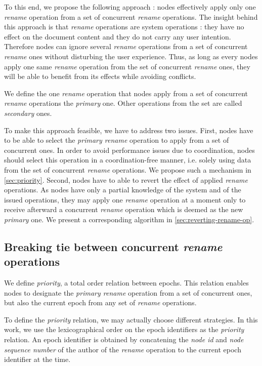 \documentclass[10pt,journal,compsoc]{IEEEtran}
\newcommand{\ie}{i.e. }
\begin{document}
To this end, we propose the following approach : nodes effectively apply only one \emph{rename} operation from a set of concurrent \emph{rename} operations.
The insight behind this approach is that \emph{rename} operations are system operations : they have no effect on the document content and they do not carry any user intention.
Therefore nodes can ignore several \emph{rename} operations from a set of concurrent \emph{rename} ones without disturbing the user experience.
Thus, as long as every nodes apply one same \emph{rename} operation from the set of concurrent \emph{rename} ones, they will be able to benefit from its effects while avoiding conflicts.

We define the one \emph{rename} operation that nodes apply from a set of concurrent \emph{rename} operations the \emph{primary} one.
Other operations from the set are called \emph{secondary} ones.

To make this approach feasible, we have to address two issues.
First, nodes have to be able to select the \emph{primary rename} operation to apply from a set of concurrent ones.
In order to avoid performance issues due to coordination, nodes should select this operation in a coordination-free manner, \ie solely using data from the set of concurrent \emph{rename} operations.
We propose such a mechanism in \autoref{sec:priority}.
Second, nodes have to able to revert the effect of applied \emph{rename} operations.
As nodes have only a partial knowledge of the system and of the issued operations, they may apply one \emph{rename} operation at a moment only to receive afterward a concurrent \emph{rename} operation which is deemed as the new \emph{primary} one.
We present a corresponding algorithm in \autoref{sec:reverting-rename-op}.

\subsection{Breaking tie between concurrent \emph{rename} operations}
\label{sec:priority}

We define \emph{priority}, a total order relation between epochs.
This relation enables nodes to designate the \emph{primary rename} operation from a set of concurrent ones, but also the current epoch from any set of \emph{rename} operations.

To define the \emph{priority} relation, we may actually choose different strategies.
In this work, we use the lexicographical order on the epoch identifiers as the \emph{priority} relation.
An epoch identifier is obtained by concatening the \emph{node id} and \emph{node sequence number} of the author of the \emph{rename} operation to the current epoch identifier at the time.
\end{document}
